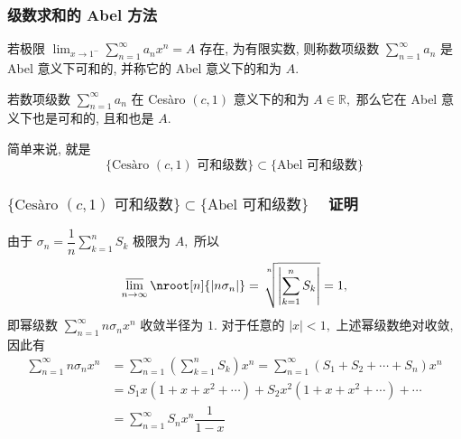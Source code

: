 
\begin{frame}
\frametitle{级数求和的 Abel 方法}

\begin{Def}
若极限 $\displaystyle \lim_{x \to 1^-} \sum_{n=1}^{\infty} a_n x^n = A$ 存在, 为有限实数, 则称数项级数 $\displaystyle \sum_{n=1}^\infty a_n$ 是 Abel 意义下可和的, 并称它的 Abel 意义下的和为 $A.$
\end{Def}

\pause
\vspace{1em}

\begin{prop}
若数项级数 $\displaystyle \sum_{n=1}^\infty a_n$ 在 Cesàro $(c, 1)$ 意义下的和为 $A \in \mathbb{R},$ 那么它在 Abel 意义下也是可和的, 且和也是 $A.$
\end{prop}

\pause

简单来说, 就是
\[
\{ \text{Cesàro $(c, 1)$ 可和级数} \} \subset \{ \text{Abel 可和级数} \}
\]

\end{frame}


\begin{frame}
\frametitle{$\{ \text{Cesàro $(c, 1)$ 可和级数} \} \subset \{ \text{Abel 可和级数} \}$ ~ 证明}

由于 $\displaystyle \sigma_n = \dfrac{1}{n} \sum_{k=1}^{n} S_k$ 极限为 $A,$ 所以
\[
\varlimsup_{n\to\infty} \nroot[n]{|n \sigma_n|} = \sqrt[\leftroot{-1}\uproot{18}n]{\left| \sum_{k=1}^{n} S_k \right|} = 1,
\]
即幂级数 $\displaystyle \sum_{n=1}^{\infty} n \sigma_n x^n$ 收敛半径为 $1.$
\pause
对于任意的 $|x| < 1,$ 上述幂级数绝对收敛, 因此有
\begin{align*}
\sum_{n=1}^{\infty} n \sigma_n x^n & = \sum_{n=1}^{\infty} \left( \sum_{k=1}^{n} S_k \right) x^n = \sum_{n=1}^{\infty} \left( S_1 + S_2 + \cdots + S_n \right) x^n \\
& = S_1 x (1 + x + x^2 + \cdots) + S_2 x^2 (1 + x + x^2 + \cdots) + \cdots \\
& = \sum_{n=1}^{\infty} S_n x^n \dfrac{1}{1-x}
\end{align*}

\end{frame}


